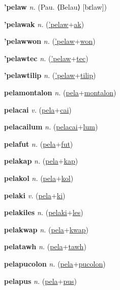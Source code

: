 \textbf{\hypertarget{'pelaw}{'pelaw}} \textit{n.} (Pau. ⟨Belau⟩ [bɛlaw])


\textbf{\hypertarget{'pelawak}{'pelawak}} \textit{n.} (\hyperlink{'pelaw}{'pelaw}+\allowbreak \hyperlink{ak}{ak})


\textbf{\hypertarget{'pelawwon}{'pelawwon}} \textit{n.} (\hyperlink{'pelaw}{'pelaw}+\allowbreak \hyperlink{won}{won})


\textbf{\hypertarget{'pelawtec}{'pelawtec}} \textit{n.} (\hyperlink{'pelaw}{'pelaw}+\allowbreak \hyperlink{tec}{tec})


\textbf{\hypertarget{'pelawtilip}{'pelawtilip}} \textit{n.} (\hyperlink{'pelaw}{'pelaw}+\allowbreak \hyperlink{tilip}{tilip})


\textbf{\hypertarget{pelamontalon}{pelamontalon}} \textit{n.} (\hyperlink{pela}{pela}+\allowbreak \hyperlink{montalon}{montalon})


\textbf{\hypertarget{pelacai}{pelacai}} \textit{v.} (\hyperlink{pela}{pela}+\allowbreak \hyperlink{cai}{cai})


\textbf{\hypertarget{pelacailum}{pelacailum}} \textit{n.} (\hyperlink{pelacai}{pelacai}+\allowbreak \hyperlink{lum}{lum})


\textbf{\hypertarget{pelafut}{pelafut}} \textit{n.} (\hyperlink{pela}{pela}+\allowbreak \hyperlink{fut}{fut})


\textbf{\hypertarget{pelakap}{pelakap}} \textit{n.} (\hyperlink{pela}{pela}+\allowbreak \hyperlink{kap}{kap})


\textbf{\hypertarget{pelakol}{pelakol}} \textit{n.} (\hyperlink{pela}{pela}+\allowbreak \hyperlink{kol}{kol})


\textbf{\hypertarget{pelaki}{pelaki}} \textit{v.} (\hyperlink{pela}{pela}+\allowbreak \hyperlink{ki}{ki})


\textbf{\hypertarget{pelakiles}{pelakiles}} \textit{n.} (\hyperlink{pelaki}{pelaki}+\allowbreak \hyperlink{les}{les})


\textbf{\hypertarget{pelakwap}{pelakwap}} \textit{n.} (\hyperlink{pela}{pela}+\allowbreak \hyperlink{kwap}{kwap})


\textbf{\hypertarget{pelatawh}{pelatawh}} \textit{n.} (\hyperlink{pela}{pela}+\allowbreak \hyperlink{tawh}{tawh})


\textbf{\hypertarget{pelapucolon}{pelapucolon}} \textit{n.} (\hyperlink{pela}{pela}+\allowbreak \hyperlink{pucolon}{pucolon})


\textbf{\hypertarget{pelapus}{pelapus}} \textit{n.} (\hyperlink{pela}{pela}+\allowbreak \hyperlink{pus}{pus})


